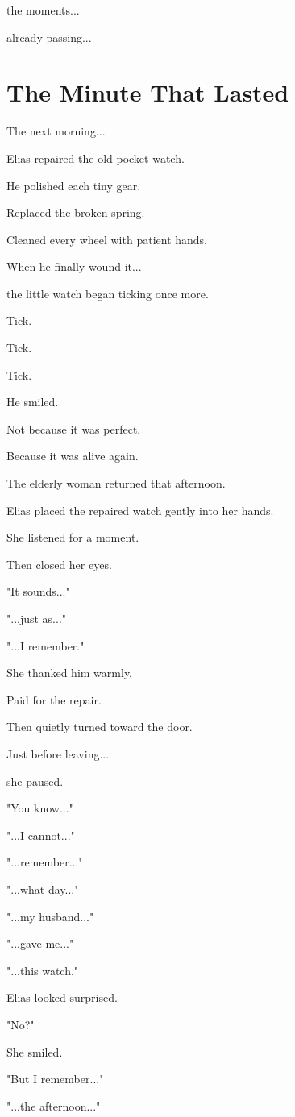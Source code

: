 \documentclass[12pt,openany]{book}
\begin{document}
the moments...

already passing...
\section*{The Minute That Lasted}

The next morning...

Elias repaired the old pocket watch.

He polished each tiny gear.

Replaced the broken spring.

Cleaned every wheel with patient hands.

When he finally wound it...

the little watch began ticking once more.

Tick.

Tick.

Tick.

He smiled.

Not because it was perfect.

Because it was alive again.

The elderly woman returned that afternoon.

Elias placed the repaired watch gently into her hands.

She listened for a moment.

Then closed her eyes.

"It sounds..."

"...just as..."

"...I remember."

She thanked him warmly.

Paid for the repair.

Then quietly turned toward the door.

Just before leaving...

she paused.

"You know..."

"...I cannot..."

"...remember..."

"...what day..."

"...my husband..."

"...gave me..."

"...this watch."

Elias looked surprised.

"No?"

She smiled.

"But I remember..."

"...the afternoon..."
\end{document}
